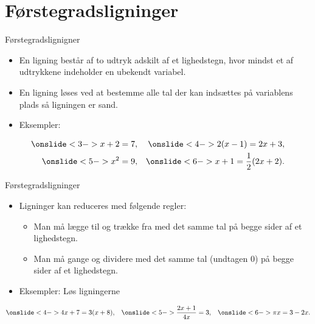 \section{Førstegradsligninger}
\begin{frame}{Førstegradslignigner}
\begin{itemize}
		\setlength\itemsep{1em}
	\item<1-> En ligning består af to udtryk adskilt af et lighedstegn, hvor mindst et af udtrykkene indeholder en ubekendt variabel.
	\item<2-> En ligning løses ved at bestemme alle tal der kan indsættes på variablens plads så ligningen er sand.
	\item<3-> Eksempler:
\end{itemize}
	\begin{align*}
\onslide<3->{x+2=7,}&& \onslide<4->{2(x-1)=2x+3,}\\ \onslide<5->{x^2=9,}&&\onslide<6->{ x+1=\frac{1}{2}(2x+2).}
\end{align*}
\end{frame}

\begin{frame}{Førstegradsligninger}
\begin{itemize}
		\setlength\itemsep{1em}
	\item<1-> Ligninger kan reduceres med følgende regler:
	\begin{itemize}
			\setlength\itemsep{1em}
		\item<2-> Man må lægge til og trække fra med det samme tal på begge sider af et lighedstegn.
		\item<3-> Man må gange og dividere med det samme tal (undtagen 0) på begge sider af et lighedstegn.
	\end{itemize}
	\item<4-> Eksempler: Løs ligningerne

\end{itemize}
	\begin{align*}
\onslide<4->{4x+7=3(x+8),}&& \onslide<5->{\frac{2x+1}{4x}=3,}&& \onslide<6->{\pi x=3-2x.}
\end{align*}
\end{frame}

